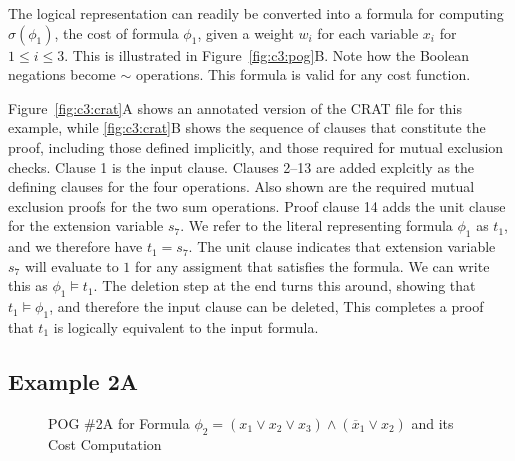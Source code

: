 \documentclass{llncs}
\newcommand{\tautology}{1}
\newcommand{\obar}[1]{\overline{#1}}
\newcommand{\oneminus}{{\sim}}
\newcommand{\turnstile}{\models}
\newcommand{\cost}{\sigma}
\begin{document}
The logical representation can readily be converted into a formula for
computing $\cost(\phi_1)$, the cost of formula $\phi_1$, given a weight
$w_i$ for each variable $x_i$ for $1 \leq i \leq 3$.  This is
illustrated in Figure~\ref{fig:c3:pog}B\@.  Note how the Boolean
negations become $\oneminus$ operations.  This formula is valid for
any cost function.

Figure~\ref{fig:c3:crat}A shows an annotated version of the CRAT file
for this example, while \ref{fig:c3:crat}B shows the sequence of clauses that constitute the proof, including those defined implicitly, and those required for mutual exclusion checks.
   Clause 1
is the input clause.
Clauses 2--13 are added explcitly as the defining clauses for the four operations.
Also shown are the required mutual exclusion proofs for the two sum operations.
Proof clause 14 adds the unit clause for the extension variable $s_7$.
We refer to the literal representing formula $\phi_1$ as $t_1$,
and we therefore have $t_1 = s_7$.
The unit clause indicates that extension variable $s_7$ will evaluate to
$\tautology$  for any assigment that satisfies the formula.  We
can write this as $\phi_1 \turnstile t_1$.  The
deletion step at the end turns this around, showing that
$t_1 \turnstile \phi_1$,
and therefore the input clause can be deleted, This
completes a proof that $t_1$ is logically
equivalent to the input formula.

\subsection{Example 2A}

\begin{figure}
  \caption{POG \#2A for Formula $\phi_2 = (x_1 \lor x_2 \lor x_3) \land (\obar{x}_1 \lor x_2)$ and its Cost Computation}
\label{fig:p2-bdd:pog}
\end{figure}
\end{document}
